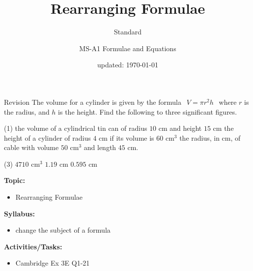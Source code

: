 \documentclass[aspectratio=169,10pt]{beamer}
\title{Rearranging Formulae}
\subtitle{Standard}
\author{MS-A1 Formulae and Equations}
\date{updated: \today
}
\begin{document}
\begin{frame}{Revision}
The volume for a cylinder is given by the formula $\ \ V=\pi r^2h\ \ $ where $r$ is the radius, and $h$ is the height. Find the following to three significant figures.
\begin{tasks}(1)
\task the volume of a cylindrical tin can of radius $10$ cm and height $15$ cm
\task the height of a cylinder of radius $4$ cm if its volume is $60$ cm$^3$
\task the radius, in cm, of cable with volume $50$ cm$^3$ and length $45$ cm.
\end{tasks}\vspace{7pt}\pause
  \begin{solution}[]
    \begin{tasks}(3)
    \task \pause$4710$ cm$^3$
    \task \pause$1.19$ cm
    \task \pause$0.595$ cm
    \end{tasks}
    \end{solution}
\end{frame}

\frame{\titlepage}

\begin{frame}
  \begin{outcome}
    \textbf{Topic:}
    \begin{itemize}
      \item[] Rearranging Formulae
    \end{itemize}

    \textbf{Syllabus:}
    \begin{itemize}
      \item change the subject of a formula
    \end{itemize}

    \textbf{Activities/Tasks:}
    \begin{itemize}
      \item Cambridge Ex 3E Q1-21
    \end{itemize}
  \end{outcome}
\end{frame}
\end{document}
